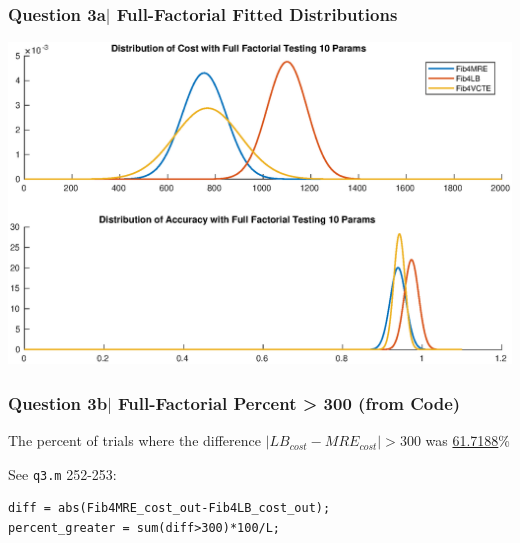 \documentclass[aspectratio=1610]{beamer}
\begin{document}
\begin{frame}
\frametitle{Question 3a$|$ Full-Factorial Fitted Distributions}
\includegraphics[width = \textwidth]{fitted_dist}
\end{frame}

\begin{frame}[fragile]
\frametitle{Question 3b$|$ Full-Factorial Percent > 300 (from Code)}
The percent of trials where the difference $|LB_{cost} - MRE_{cost}| > 300$ was \underline{61.7188}\%

\vspace{2em}
See \verb|q3.m|  252-253:

\begin{center}
\begin{verbatim}
diff = abs(Fib4MRE_cost_out-Fib4LB_cost_out);
percent_greater = sum(diff>300)*100/L;
\end{verbatim}
\end{center}
\end{frame}
\end{document}

